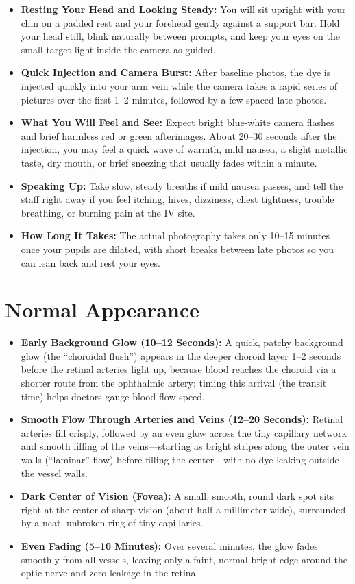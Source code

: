 \begin{itemize}
    \item \textbf{Resting Your Head and Looking Steady:} You will sit upright with your chin on a padded rest and your forehead gently against a support bar. Hold your head still, blink naturally between prompts, and keep your eyes on the small target light inside the camera as guided.
    \item \textbf{Quick Injection and Camera Burst:} After baseline photos, the dye is injected quickly into your arm vein while the camera takes a rapid series of pictures over the first 1--2 minutes, followed by a few spaced late photos.
    \item \textbf{What You Will Feel and See:} Expect bright blue-white camera flashes and brief harmless red or green afterimages. About 20--30 seconds after the injection, you may feel a quick wave of warmth, mild nausea, a slight metallic taste, dry mouth, or brief sneezing that usually fades within a minute.
    \item \textbf{Speaking Up:} Take slow, steady breaths if mild nausea passes, and tell the staff right away if you feel itching, hives, dizziness, chest tightness, trouble breathing, or burning pain at the IV site.
    \item \textbf{How Long It Takes:} The actual photography takes only 10--15 minutes once your pupils are dilated, with short breaks between late photos so you can lean back and rest your eyes.
\end{itemize}

\section{Normal Appearance}

\begin{itemize}
    \item \textbf{Early Background Glow (10--12 Seconds):} A quick, patchy background glow (the ``choroidal flush'') appears in the deeper choroid layer 1--2 seconds before the retinal arteries light up, because blood reaches the choroid via a shorter route from the ophthalmic artery; timing this arrival (the transit time) helps doctors gauge blood-flow speed.
    \item \textbf{Smooth Flow Through Arteries and Veins (12--20 Seconds):} Retinal arteries fill crisply, followed by an even glow across the tiny capillary network and smooth filling of the veins---starting as bright stripes along the outer vein walls (``laminar'' flow) before filling the center---with no dye leaking outside the vessel walls.
    \item \textbf{Dark Center of Vision (Fovea):} A small, smooth, round dark spot sits right at the center of sharp vision (about half a millimeter wide), surrounded by a neat, unbroken ring of tiny capillaries.
    \item \textbf{Even Fading (5--10 Minutes):} Over several minutes, the glow fades smoothly from all vessels, leaving only a faint, normal bright edge around the optic nerve and zero leakage in the retina.
\end{itemize}

